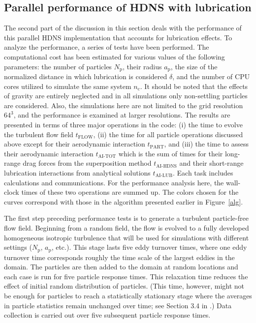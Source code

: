 \documentclass[../thesis.tex]{subfiles}
\begin{document}
\subsection{Parallel performance of HDNS with lubrication\label{sec:per}}
The second part of the discussion in this section deals with the performance of this parallel HDNS implementation that accounts for lubrication effects. To analyze the performance, a series of tests have been performed. The computational cost has been estimated for various values of the following parameters: the number of particles $N_\text{p}$, their radius $a_\text{p}$, the size of the normalized distance in which lubrication is considered $\delta$, and the number of CPU cores utilized to simulate the same system $n_\text{c}$. It should be noted that the effects of gravity are entirely neglected and in all simulations only non-settling particles are considered. Also, the simulations here are not limited to the grid resolution $64^3$, and the performance is examined at larger resolutions. The results are presented in terms of three major operations in the code: (i) the time to evolve the turbulent flow field $t_\text{FLOW}$, (ii) the time for all particle operations discussed above except for their aerodynamic interaction $t_\text{PART}$, and (iii) the time to assess their aerodynamic interaction $t_\text{AI-TOT}$ which is the sum of times for their long-range drag forces from the superposition method $t_\text{AI-HDNS}$ and their short-range lubrication interactions from analytical solutions $t_\text{AI-LUB}$. Each task includes calculations and communications. For the performance analysis here, the wall-clock times of these two operations are summed up. The colors chosen for the curves correspond with those in the algorithm presented earlier in Figure~\ref{alg}. 

The first step preceding performance tests is to generate a turbulent particle-free flow field. Beginning from a random field, the flow is evolved to a fully developed homogeneous isotropic turbulence that will be used for simulations with different settings ($N_\text{p}$, $a_\text{p}$, etc.). This stage lasts five eddy turnover times, where one eddy turnover time corresponds roughly the time scale of the largest eddies in the domain. The particles are then added to the domain at random locations and each case is run for five particle response times. This relaxation time reduces the effect of initial random distribution of particles. (This time, however, might not be enough for particles to reach a statistically stationary stage where the averages in particle statistics remain unchanged over time; see Section 3.4 in \cite{AGW07}.) Data collection is carried out over five subsequent particle response times.
\end{document}
